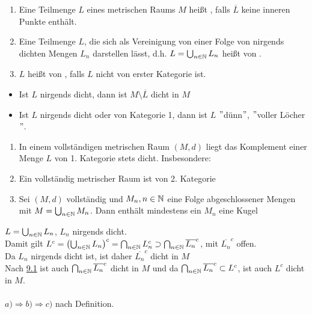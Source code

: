 \begin{definition} \label{def:9.2}
	\begin{enumerate}[label=\alph*\upshape)]
		\label{def:9.2a}
		\item Eine Teilmenge $L$ eines metrischen Raums $M$ hei{\ss}t , falls $\overline{L}$ keine inneren Punkte enthält.
		\label{def:9.2b}
		\item Eine Teilmenge $L$, die sich als Vereinigung von einer Folge von nirgends dichten Mengen $L_{n}$ darstellen lässt, d.h. $L = \bigcup_{n \in \mathbb{N}} L_{n}$ hei{\ss}t von .
		\label{def:9.2c}
		\item $L$ hei{\ss}t von , falls $L$ nicht von erster Kategorie ist.
	\end{enumerate}
\end{definition}


\begin{bemerkung*}
	\begin{itemize}
		\item Ist $L$ nirgends dicht, dann ist $M \setminus \overline{L}$ dicht in $M$
		\item Ist $L$ nirgends dicht oder von Kategorie 1, dann ist $L$ $"$dünn$"$, $"$voller Löcher$"$.
	\end{itemize}	
\end{bemerkung*}


\begin{kor} \label{kor:9.3-KategoriensatzVonBaire}
	\begin{enumerate}[label=\alph*\upshape)]
		\item In einem vollständigen metrischen Raum $(M, d)$ liegt das Komplement einer Menge $L$ von 1. Kategorie stets dicht. Insbesondere:
		\item Ein vollständig metrischer Raum ist von 2. Kategorie
		\item Sei $(M, d)$ vollständig und $M_{n}, n \in \mathbb{N}$ eine Folge abgeschlossener Mengen mit $M = \bigcup_{n \in \mathbb{N}} M_{n}$. Dann enthält mindestens ein $M_{n}$ eine Kugel
	\end{enumerate}	
\end{kor}

\begin{beweis}
	$L = \bigcup_{n \in \mathbb{N}} L_{n}$, $L_{n}$ nirgends dicht. \\
	Damit gilt $L^{c} = \left( \bigcup_{n \in \mathbb{N}} L_{n} \right)^{c} = \bigcap_{n \in \mathbb{N}} L_{n}^{c} \supset \bigcap_{n \in \mathbb{N}} \overline{L_{n}}^{c}$, mit $\overline{L_{n}}^{c}$ offen. \\
	Da $L_{n}$ nirgends dicht ist, ist daher $\overline{L_{n}}^{c}$ dicht in $M$ \\
	Nach \hyperref[satz:9.1-baire]{9.1} ist auch $\bigcap_{n \in \mathbb{N}} \overline{L_{n}}^{c}$ dicht in $M$ und da $\bigcap_{n \in \mathbb{N}} \overline{L_{n}}^{c} \subset L^{c}$, ist auch $L^{c}$  dicht in $M$. \\ \\
	$a) \Rightarrow b) \Rightarrow c)$ nach Definition.
\end{beweis}


